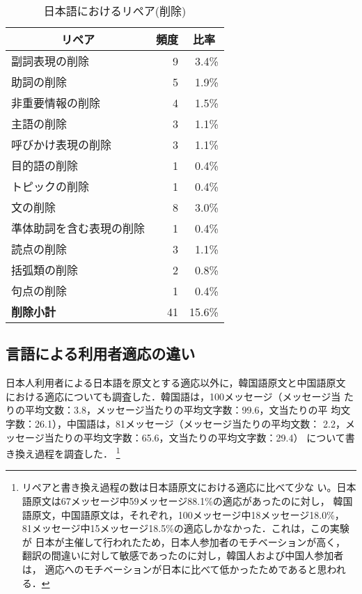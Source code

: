 \begin{table}[htbp]
    \leavevmode
\small
    \caption{日本語におけるリペア(削除)}
    \label{Table:Repairs_in_Japanese3}
    \vspace*{-3mm}
\begin {center}
\begin{tabular}{|l|r|r|}
\hline
\multicolumn{1}{|c|}{\bf リペア} & 
\multicolumn{1}{c|}{\bf 頻度} & 
\multicolumn{1}{c|}{\bf 比率} \\
\hline 
副詞表現の削除               &  9 &  3.4\% \\
助詞の削除                   &  5 &  1.9\% \\ 
\hline
非重要情報の削除             &  4 &  1.5\% \\
主語の削除                   &  3 &  1.1\% \\
呼びかけ表現の削除           &  3 &  1.1\% \\
目的語の削除                 &  1 &  0.4\% \\
トピックの削除               &  1 &  0.4\% \\
\hline
文の削除                     &  8 &  3.0\% \\
準体助詞を含む表現の削除     &  1 &  0.4\% \\
\hline 
読点の削除                   &  3 &  1.1\% \\
括弧類の削除                 &  2 &  0.8\% \\
句点の削除                   &  1 &  0.4\% \\
\hline
{\bf 削除小計}               & 41 & 15.6\% \\
\hline
\end{tabular}
\end{center}
    \vspace*{-3mm}
\end{table}

\subsection{言語による利用者適応の違い}

日本人利用者による日本語を原文とする適応以外に，韓国語原文と中国語原文
における適応についても調査した．韓国語は，100メッセージ（メッセージ当
たりの平均文数：3.8，メッセージ当たりの平均文字数：99.6，文当たりの平
均文字数：26.1），中国語は，81メッセージ（メッセージ当たりの平均文数：
2.2，メッセージ当たりの平均文字数：65.6，文当たりの平均文字数：29.4）
について書き換え過程を調査した．
\footnote{リペアと書き換え過程の数は日本語原文における適応に比べて少な
い。日本語原文は67メッセージ中59メッセージ88.1\%の適応があったのに対し，
韓国語原文，中国語原文は，それぞれ，100メッセージ中18メッセージ18.0\%，
81メッセージ中15メッセージ18.5\%の適応しかなかった．これは，この実験が
日本が主催して行われたため，日本人参加者のモチベーションが高く，
翻訳の間違いに対して敏感であったのに対し，韓国人および中国人参加者は，
適応へのモチベーションが日本に比べて低かったためであると思われる．}

